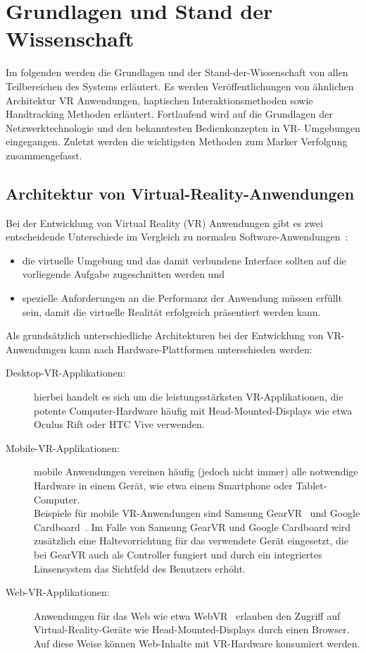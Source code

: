 \section{Grundlagen und Stand der Wissenschaft}\label{sec:grundlagen}
Im folgenden werden die Grundlagen und der Stand-der-Wissenschaft von allen Teilbereichen des  Systems erläutert. Es werden Veröffentlichungen von ähnlichen Architektur VR Anwendungen, haptischen Interaktionsmethoden sowie Handtracking Methoden erläutert. Fortlaufend wird auf die Grundlagen der Netzwerktechnologie und den bekanntesten Bedienkonzepten in VR- Umgebungen eingegangen. Zuletzt werden die wichtigsten Methoden zum Marker Verfolgung zusammengefasst.
\subsection{Architektur von Virtual-Reality-Anwendungen}\label{sec:ArchitekturAnwendungen}
Bei der Entwicklung von Virtual Reality (VR) Anwendungen gibt es zwei entscheidende Unterschiede im Vergleich zu normalen Software-Anwendungen~\cite{bryson1995approaches}:
\begin{itemize}
	\item die virtuelle Umgebung und das damit verbundene Interface sollten auf die vorliegende Aufgabe zugeschnitten werden und
	\item spezielle Anforderungen an die Performanz der Anwendung müssen erfüllt sein, damit die virtuelle Realität erfolgreich präsentiert werden kann.
\end{itemize}

Als grundsätzlich unterschiedliche Architekturen bei der Entwicklung von VR-An\-wen\-dung\-en kann nach Hardware-Plattformen unterschieden werden:
\begin{description}
	\item[Desktop-VR-Applikationen:] hierbei handelt es sich um die leistungsstärksten VR-Applikationen, die potente Computer-Hardware häufig mit Head-Mounted-Displays wie etwa Oculus Rift oder HTC Vive verwenden.
	\item[Mobile-VR-Applikationen:] mobile Anwendungen vereinen häufig (jedoch nicht immer) alle notwendige Hardware in einem Gerät, wie etwa einem Smartphone oder Tablet-Computer.\\ Beispiele für mobile VR-Anwendungen sind Samsung GearVR~\cite{website:gearVRpressRelease} und Google Cardboard~\cite{website:googleCardboard}. Im Falle von Samsung GearVR und Google Cardboard wird zusätzlich eine Haltevorrichtung für das verwendete Gerät eingesetzt, die bei GearVR auch als Controller fungiert und durch ein integriertes Linsensystem das Sichtfeld des Benutzers erhöht.
	\item[Web-VR-Applikationen:] Anwendungen für das Web wie etwa WebVR~\cite{website:webVR} erlauben den Zugriff auf Virtual-Reality-Geräte wie Head-Mounted-Displays durch einen Browser. Auf diese Weise können Web-Inhalte mit VR-Hardware konsumiert werden.
\end{description}

